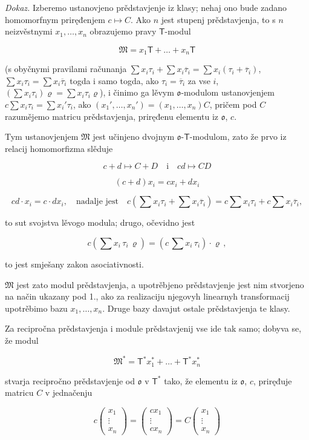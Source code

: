 \documentclass[11pt]{article}
\begin{document}
\emph{Dokaz.} Izberemo ustanovjeno prědstavjenje iz klasy; nehaj ono bude zadano homomorfnym priręđenjem \(c\mapsto C\). Ako \(n\) jest stupenj prědstavjenja, to s \(n\) neizvěstnymi \(x_1,\ldots,x_n\) obrazujemo pravy \(\mathsf T\)-modul

\[\mathfrak{M} = x_1 \mathsf{T} + \dots + x_n \mathsf{T}\]

(s obyčnymi pravilami računanja \(\sum x_i\tau_i+\sum x_i\overline{\tau}_i=\sum x_i(\tau_i+\overline{\tau}_i)\), \(\sum x_i\tau_i=\sum x_i\overline{\tau}_i\) togda i samo togda, ako \(\tau_i=\overline{\tau}_i\) za vse \(i\), \((\sum x_i\tau_i)\varrho=\sum x_i\tau_i\varrho\)), i činimo ga lěvym \(\mathfrak{o}\)-modulom ustanovjenjem \(c\sum x_i\tau_i=\sum x_i'\tau_i\), ako \((x_1',\ldots,x_n')=(x_1,\ldots,x_n)C\), pričem pod \(C\) razumějemo matricu prědstavjenja, priręđenu elementu iz \(\mathfrak{o}\), \(c\).

Tym ustanovjenjem \(\mathfrak M\) jest učinjeno dvojnym \(\mathfrak{o}\)-\(\mathsf T\)-modulom, zato že prvo iz relacij homomorfizma slěduje

\[
c+d\mapsto C+D \quad \text{i} \quad cd\mapsto CD
\]

\[
(c+d)x_i=cx_i+dx_i
\]

\[
cd\cdot x_i=c\cdot dx_i,\quad\text{nadalje jest}\quad
c\left(\sum x_i\tau_i+\sum x_i\overline{\tau}_i\right)
=c\sum x_i\tau_i+c\sum x_i\overline{\tau}_i,
\]

to sut svojstva lěvogo modula; drugo, očevidno jest

\[c(\sum x_i \, \tau_i \, \varrho) = (c \, \sum x_i \, \tau_i) \cdot \varrho \,,\]

to jest smješany zakon asociativnosti.

\(\mathfrak{M}\) jest zato modul prědstavjenja, a upotrěbjeno prědstavjenje jest nim stvorjeno na način ukazany pod 1., ako za realizaciju njegovyh linearnyh transformacij upotrěbimo bazu \(x_1, \ldots, x_n\). Druge bazy davajut ostale prědstavjenja te klasy.

Za recipročna prědstavjenja i module prědstavjenij vse ide tak samo; dobyva se, že modul

\[\mathfrak{M}^* = \mathsf{T}^* x_1^* + \dots + \mathsf{T}^* x_n^*\]

stvarja recipročno prědstavjenje od \(\mathfrak{o}\) v \(\mathsf T^*\) tako, že elementu iz \(\mathfrak{o}\), \(c\), priręđuje matricu \(C\) v jednačenju

\[
c\begin{pmatrix}x_1\\ \vdots\\ x_n\end{pmatrix}
=\begin{pmatrix}cx_1\\ \vdots\\ cx_n\end{pmatrix}
=C\begin{pmatrix}x_1\\ \vdots\\ x_n\end{pmatrix}
\]
\end{document}
